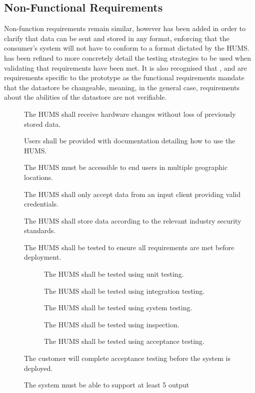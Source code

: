 \subsection{Non-Functional Requirements}
Non-function requirements remain similar, however  has been 
added in order to clarify that data can be sent and stored in any format, 
enforcing that the consumer's system will not have to conform to a format
dictated by the HUMS.  has been refined to more concretely detail the
testing strategies to be used when validating that requirements have been met.
It is also recognised that ,  and  are requirements 
specific to the prototype as the functional requirements mandate that the 
datastore be changeable, meaning, in the general case, requirements 
about the abilities of the datastore are not verifiable.
\begin{description}
	\item[] The HUMS shall receive hardware changes without loss 
	of previously stored data.
	\item[]  Users shall be provided with documentation detailing 
	how 	to use the HUMS.
	\item[] The HUMS must be accessible to end users in multiple 	
	geographic locations.
	\item[]  The HUMS shall only accept data from an input client 	
	providing valid credentials. 
	\item[] The HUMS shall store data according to the relevant 	
	industry security standards. 
	\item[]  The HUMS shall be tested to ensure all requirements are 
	met before deployment.
	\begin{description}
	\item[]  The HUMS shall be tested using unit testing.
	\item[]  The HUMS shall be tested using integration testing.
	\item[]  The HUMS shall be tested using system testing.
	\item[]  The HUMS shall be tested using inspection.
	\item[]  The HUMS shall be tested using acceptance testing.
	\end{description}
	\item[] The customer will complete acceptance testing before the 
	system is deployed.
	\item[] The system must be able to support at least 5 output 

\end{description}
